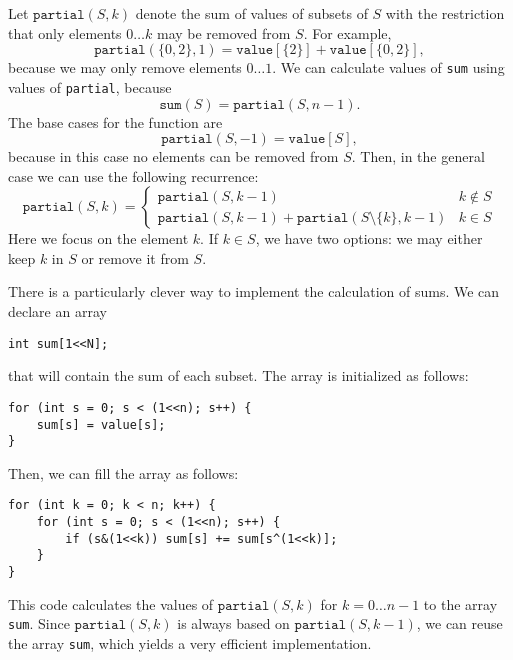 Let $\texttt{partial}(S,k)$ denote the sum of
values of subsets of $S$ with the restriction
that only elements $0 \ldots k$
may be removed from $S$.
For example,
\[\texttt{partial}(\{0,2\},1)=\texttt{value}[\{2\}]+\texttt{value}[\{0,2\}],\]
because we may only remove elements $0 \ldots 1$.
We can calculate values of \texttt{sum} using
values of \texttt{partial}, because
\[\texttt{sum}(S) = \texttt{partial}(S,n-1).\]
The base cases for the function are
\[\texttt{partial}(S,-1)=\texttt{value}[S],\]
because in this case no elements can be removed from $S$.
Then, in the general case we can use the following recurrence:
\begin{equation*}
    \texttt{partial}(S,k) = \begin{cases}
               \texttt{partial}(S,k-1) & k \notin S \\
               \texttt{partial}(S,k-1) + \texttt{partial}(S \setminus \{k\},k-1) & k \in S
           \end{cases}
\end{equation*}
Here we focus on the element $k$.
If $k \in S$, we have two options: we may either keep $k$ in $S$
or remove it from $S$.

There is a particularly clever way to implement the
calculation of sums. We can declare an array
\begin{lstlisting}
int sum[1<<N];
\end{lstlisting}
that will contain the sum of each subset.
The array is initialized as follows:
\begin{lstlisting}
for (int s = 0; s < (1<<n); s++) {
    sum[s] = value[s];
}
\end{lstlisting}
Then, we can fill the array as follows:
\begin{lstlisting}
for (int k = 0; k < n; k++) {
    for (int s = 0; s < (1<<n); s++) {
        if (s&(1<<k)) sum[s] += sum[s^(1<<k)];
    }
}
\end{lstlisting}
This code calculates the values of $\texttt{partial}(S,k)$
for $k=0 \ldots n-1$ to the array \texttt{sum}.
Since $\texttt{partial}(S,k)$ is always based on
$\texttt{partial}(S,k-1)$, we can reuse the array
\texttt{sum}, which yields a very efficient implementation.